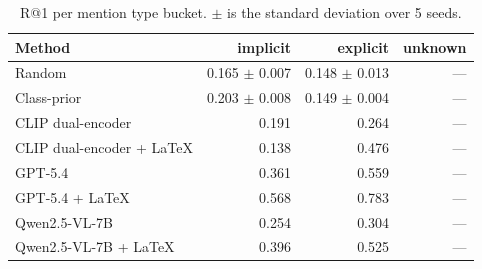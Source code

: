 \begin{table}[t]
\centering
\caption{R@1 per mention type bucket. $\pm$ is the standard deviation over 5 seeds.}
\label{tab:bd_mention_type_r1}
\begin{tabular}{lrrr}
\toprule
Method & implicit & explicit & unknown \\
\midrule
Random & 0.165 $\pm$ 0.007 & 0.148 $\pm$ 0.013 & — \\
Class-prior & 0.203 $\pm$ 0.008 & 0.149 $\pm$ 0.004 & — \\
CLIP dual-encoder & 0.191 & 0.264 & — \\
CLIP dual-encoder + LaTeX & 0.138 & 0.476 & — \\
GPT-5.4 & 0.361 & 0.559 & — \\
GPT-5.4 + LaTeX & 0.568 & 0.783 & — \\
Qwen2.5-VL-7B & 0.254 & 0.304 & — \\
Qwen2.5-VL-7B + LaTeX & 0.396 & 0.525 & — \\
\bottomrule
\end{tabular}
\end{table}
